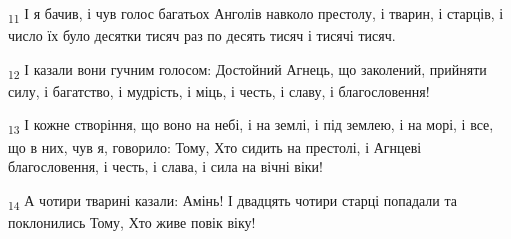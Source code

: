 \begin{tcolorbox}
\textsubscript{11} І я бачив, і чув голос багатьох Анголів навколо престолу, і тварин, і старців, і число їх було десятки тисяч раз по десять тисяч і тисячі тисяч.
\end{tcolorbox}
\begin{tcolorbox}
\textsubscript{12} І казали вони гучним голосом: Достойний Агнець, що заколений, прийняти силу, і багатство, і мудрість, і міць, і честь, і славу, і благословення!
\end{tcolorbox}
\begin{tcolorbox}
\textsubscript{13} І кожне створіння, що воно на небі, і на землі, і під землею, і на морі, і все, що в них, чув я, говорило: Тому, Хто сидить на престолі, і Агнцеві благословення, і честь, і слава, і сила на вічні віки!
\end{tcolorbox}
\begin{tcolorbox}
\textsubscript{14} А чотири тварині казали: Амінь! І двадцять чотири старці попадали та поклонились Тому, Хто живе повік віку!
\end{tcolorbox}
